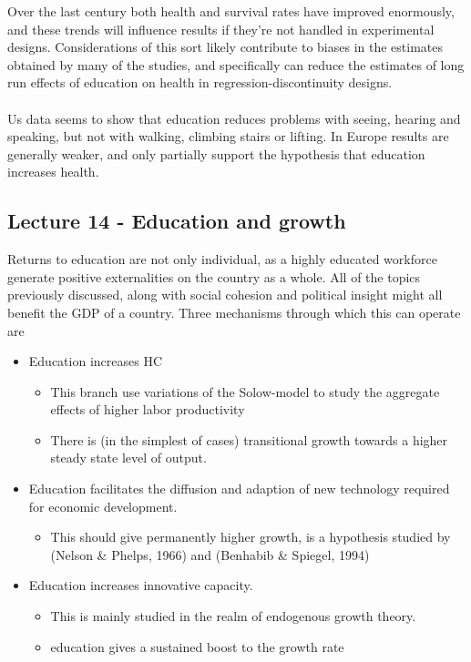 \documentclass[12pt, a4paper]{article}
\begin{document}
\begin{multicols}{2}
Over the last century both health and survival rates have improved enormously, and these trends will influence results if they're not handled in experimental designs. Considerations of this sort likely contribute to biases in the estimates obtained by many of the studies, and specifically can reduce the estimates of long run effects of education on health in regression-discontinuity designs.
\\ \\
Us data seems to show that education reduces problems with seeing, hearing and speaking, but not with walking, climbing stairs or lifting. In Europe results are generally weaker, and only partially support the hypothesis that education increases health. 



\subsection{Lecture 14 - Education and growth}
Returns to education are not only individual, as a highly educated workforce generate positive externalities on the country as a whole. All of the topics previously discussed, along with social cohesion and political insight might all benefit the GDP of a country. Three mechanisms through which this can operate are 
\begin{itemize}
\item[1)] Education increases HC
    \begin{itemize}
    \item This branch use variations of the Solow-model to study the aggregate effects of higher labor productivity
    \item There is (in the simplest of cases) transitional growth towards a higher steady state level of output.
    \end{itemize}
\item[2)] Education facilitates the diffusion and adaption of new technology required for economic development. 
    \begin{itemize}
    \item This should give permanently higher growth, is a hypothesis studied by (Nelson \& Phelps, 1966) and (Benhabib \& Spiegel, 1994)
    \end{itemize}
\item[3)] Education increases innovative capacity.
\begin{itemize}
\item This is mainly studied in the realm of endogenous growth theory.
\item education gives a sustained boost to the growth rate
\end{itemize}
\end{itemize}


\end{multicols}
\end{document}

